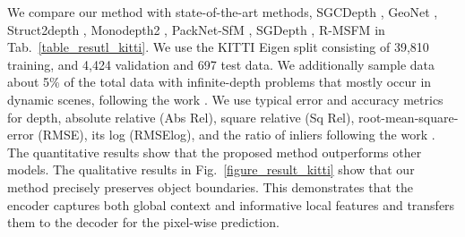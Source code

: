 \documentclass[letterpaper]{article} \usepackage{aaai23}  \usepackage{times}  \usepackage{helvet}  \usepackage{courier}  \usepackage[hyphens]{url}  \usepackage{graphicx} \urlstyle{rm} \def\UrlFont{\rm}  \usepackage{natbib}  \usepackage{caption} \frenchspacing  \setlength{\pdfpagewidth}{8.5in} \setlength{\pdfpageheight}{11in} \usepackage{algorithm}
\newcommand{\tabref}[1]{Tab.~\ref{#1}}
\newcommand{\figref}[1]{Fig.~\ref{#1}}
\begin{document}
\begin{table}[t]
    \centering
        \caption{\textbf{Quantitative comparison to state-of-the-arts.} We evaluate models trained on KITTI (K) with an input image size of .  We only use monocular images (M) for supervision.  \textbf{Bold} is the best performance.}
        \label{table_resutl_kitti}
\end{table}


We compare our method with state-of-the-art methods, SGCDepth {\cite{xiong2021self}}, GeoNet {\cite{yin2018geonet}}, Struct2depth {\cite{casser2019depth}}, Monodepth2 {\cite{godard2019digging}}, PackNet-SfM {\cite{guizilini20203d}}, SGDepth {\cite{klingner2020self}}, R-MSFM {\cite{zhou2021r}} in \tabref{table_resutl_kitti}.
We use the KITTI Eigen split \cite{geiger2013vision,eigen2015predicting} consisting of 39,810 training, and 4,424 validation and 697 test data. 
We additionally sample data about 5\% of the total data with infinite-depth problems that mostly occur in dynamic scenes, following the work \cite{guizilini2020semantically}. 
We use typical error and accuracy metrics for depth, absolute relative (Abs Rel), square relative (Sq Rel), root-mean-square-error (RMSE), its log (RMSElog), and the ratio of inliers following the work \cite{guizilini20203d}.
The quantitative results show that the proposed method outperforms other models. 
The qualitative results in \figref{figure_result_kitti} show that our method precisely preserves object boundaries. This demonstrates that the encoder captures both global context and informative local features and transfers them to the decoder for the pixel-wise prediction.
\end{document}
